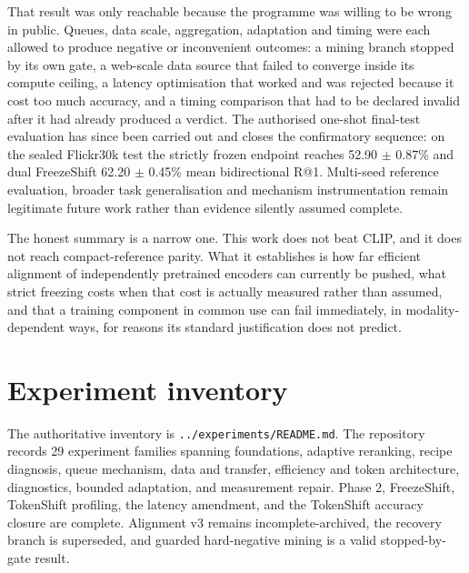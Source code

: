 That result was only reachable because the programme was willing to be wrong in public. Queues, data scale, aggregation, adaptation and timing were each allowed to produce negative or inconvenient outcomes: a mining branch stopped by its own gate, a web-scale data source that failed to converge inside its compute ceiling, a latency optimisation that worked and was rejected because it cost too much accuracy, and a timing comparison that had to be declared invalid after it had already produced a verdict. The authorised one-shot final-test evaluation has since been carried out and closes the confirmatory sequence: on the sealed Flickr30k test the strictly frozen endpoint reaches 52.90 $\pm$ 0.87\% and dual FreezeShift 62.20 $\pm$ 0.45\% mean bidirectional R@1. Multi-seed reference evaluation, broader task generalisation and mechanism instrumentation remain legitimate future work rather than evidence silently assumed complete.

The honest summary is a narrow one. This work does not beat CLIP, and it does not reach compact-reference parity. What it establishes is how far efficient alignment of independently pretrained encoders can currently be pushed, what strict freezing costs when that cost is actually measured rather than assumed, and that a training component in common use can fail immediately, in modality-dependent ways, for reasons its standard justification does not predict.

\appendix
\chapter{Experiment inventory}
The authoritative inventory is \texttt{.\linebreak[1].\linebreak[1]/\linebreak[1]experiments/\linebreak[1]README.\linebreak[1]md}. The repository records 29 experiment families spanning foundations, adaptive reranking, recipe diagnosis, queue mechanism, data and transfer, efficiency and token architecture, diagnostics, bounded adaptation, and measurement repair. Phase 2, FreezeShift, TokenShift profiling, the latency amendment, and the TokenShift accuracy closure are complete. Alignment v3 remains incomplete-archived, the recovery branch is superseded, and guarded hard-negative mining is a valid stopped-by-gate result.

